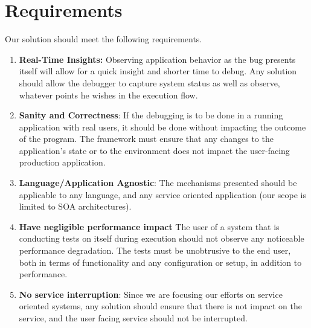 \section{Requirements}
\label{sec:introRequirements}

Our solution should meet the following requirements.

\begin{enumerate}
	\setlength{\itemsep}{0pt}
	\item \textbf{Real-Time Insights: }
	Observing application behavior as the bug presents itself will allow for a quick insight and shorter time to debug.
	Any solution should allow the debugger to capture system status as well as observe, whatever points he wishes in the execution flow.
	
	
	\item \textbf{Sanity and Correctness}:
	If the debugging is to be done in a running application with real users, it should be done without impacting the outcome of the program.
	The framework must ensure that any changes to the application's state or to the environment does not impact the user-facing production application.
	
	\item \textbf{Language/Application Agnostic}:
	The mechanisms presented should be applicable to any language, and any service oriented application (our scope is limited to SOA architectures).
	
	
	\item \textbf{Have negligible performance impact}
	The user of a system that is conducting tests on itself during execution should not observe any noticeable performance degradation. The tests must be unobtrusive to the end user, both in terms of functionality and any configuration or setup, in addition to performance.
	
	\item \textbf{No service interruption}: Since we are focusing our efforts on service oriented systems, any solution should ensure that there is not impact on the service, and the user facing service should not be interrupted.
	
\end{enumerate}


